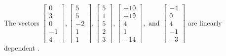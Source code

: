 \begin{exercise}
\begin{exerciseStatement}
  \end{exerciseStatement}
  \begin{exerciseAnswer}
   The vectors \(\left[\begin{array}{r}
0 \\
3 \\
0 \\
-1 \\
4
\end{array}\right] , \left[\begin{array}{r}
5 \\
5 \\
-2 \\
1 \\
1
\end{array}\right] , \left[\begin{array}{r}
5 \\
1 \\
5 \\
2 \\
3
\end{array}\right] , \left[\begin{array}{r}
-10 \\
-19 \\
4 \\
1 \\
-14
\end{array}\right] , \text{ and } \left[\begin{array}{r}
-4 \\
0 \\
4 \\
-1 \\
-3
\end{array}\right]\) are 
  	 linearly dependent  .
  


  \end{exerciseAnswer}
\end{exercise}